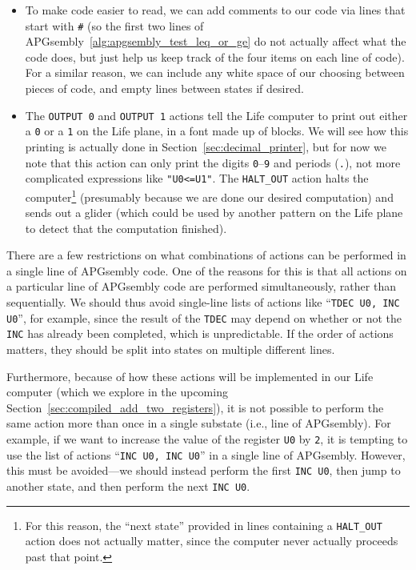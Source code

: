 \begin{itemize}
    \item To make code easier to read, we can add comments to our code via lines that start with \texttt{\#} (so the first two lines of APGsembly~\ref{alg:apgsembly_test_leq_or_ge} do not actually affect what the code does, but just help us keep track of the four items on each line of code). For a similar reason, we can include any white space of our choosing between pieces of code, and empty lines between states if desired.\smallskip
    
    \item The \texttt{OUTPUT 0} and \texttt{OUTPUT 1} actions tell the Life computer to print out either a \texttt{0} or a \texttt{1} on the Life plane, in a font made up of blocks. We will see how this printing is actually done in Section~\ref{sec:decimal_printer}, but for now we note that this action can only print the digits \texttt{0}--\texttt{9} and periods (\texttt{.}), not more complicated expressions like \texttt{"U0<=U1"}. The \texttt{HALT\_OUT} action halts the computer\footnote{For this reason, the ``next state'' provided in lines containing a \texttt{HALT\_OUT} action does not actually matter, since the computer never actually proceeds past that point.} (presumably because we are done our desired computation) and sends out a glider (which could be used by another pattern on the Life plane to detect that the computation finished).\smallskip
\end{itemize}

There are a few restrictions on what combinations of actions can be performed in a single line of APGsembly code. One of the reasons for this is that all actions on a particular line of APGsembly code are performed simultaneously, rather than sequentially. We should thus avoid single-line lists of actions like ``\texttt{TDEC U0, INC U0}'', for example, since the result of the \texttt{TDEC} may depend on whether or not the \texttt{INC} has already been completed, which is unpredictable. If the order of actions matters, they should be split into states on multiple different lines.

Furthermore, because of how these actions will be implemented in our Life computer (which we explore in the upcoming Section~\ref{sec:compiled_add_two_registers}), it is not possible to perform the same action more than once in a single substate (i.e., line of APGsembly). For example, if we want to increase the value of the register \texttt{U0} by \texttt{2}, it is tempting to use the list of actions ``\texttt{INC U0, INC U0}'' in a single line of APGsembly. However, this must be avoided---we should instead perform the first \texttt{INC U0}, then jump to another state, and then perform the next \texttt{INC U0}.

